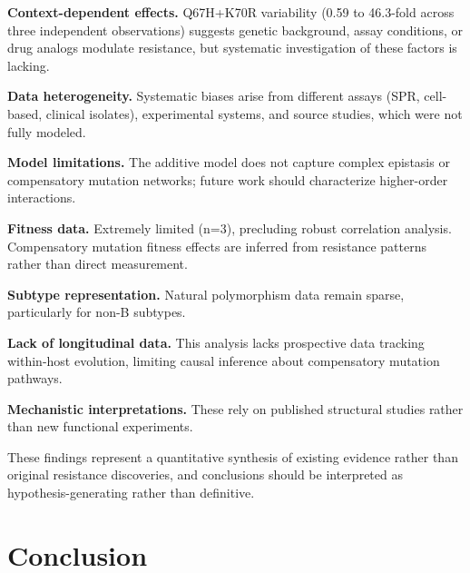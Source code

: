 \documentclass[preprint]{elsarticle}
\begin{document}
\textbf{Context-dependent effects.} Q67H+K70R variability (0.59 to 46.3-fold across three independent observations) suggests genetic background, assay conditions, or drug analogs modulate resistance, but systematic investigation of these factors is lacking.

\textbf{Data heterogeneity.} Systematic biases arise from different assays (SPR, cell-based, clinical isolates), experimental systems, and source studies, which were not fully modeled.

\textbf{Model limitations.} The additive model does not capture complex epistasis or compensatory mutation networks; future work should characterize higher-order interactions.

\textbf{Fitness data.} Extremely limited (n=3), precluding robust correlation analysis. Compensatory mutation fitness effects are inferred from resistance patterns rather than direct measurement.

\textbf{Subtype representation.} Natural polymorphism data remain sparse, particularly for non-B subtypes.

\textbf{Lack of longitudinal data.} This analysis lacks prospective data tracking within-host evolution, limiting causal inference about compensatory mutation pathways.

\textbf{Mechanistic interpretations.} These rely on published structural studies rather than new functional experiments.

These findings represent a quantitative synthesis of existing evidence rather than original resistance discoveries, and conclusions should be interpreted as hypothesis-generating rather than definitive.

\section{Conclusion}
\end{document}
